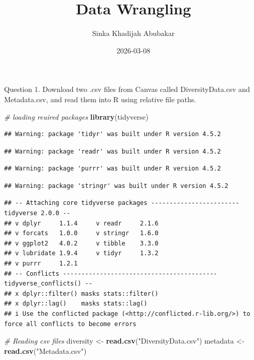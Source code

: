 \documentclass[
]{article}
\title{Data Wrangling}
\author{Sinka Khadijah Abubakar}
\date{2026-03-08}
\newenvironment{Shaded}{\begin{snugshade}}{\end{snugshade}}
\newcommand{\CommentTok}[1]{\textcolor[rgb]{0.56,0.35,0.01}{\textit{#1}}}
\newcommand{\FunctionTok}[1]{\textcolor[rgb]{0.13,0.29,0.53}{\textbf{#1}}}
\newcommand{\NormalTok}[1]{#1}
\newcommand{\OtherTok}[1]{\textcolor[rgb]{0.56,0.35,0.01}{#1}}
\newcommand{\StringTok}[1]{\textcolor[rgb]{0.31,0.60,0.02}{#1}}
\begin{document}
\maketitle

Question 1. Download two .csv files from Canvas called DiversityData.csv
and Metadata.csv, and read them into R using relative file paths.

\begin{Shaded}
\begin{Highlighting}[]
\CommentTok{\# loading reuired packages}
\FunctionTok{library}\NormalTok{(tidyverse)}
\end{Highlighting}
\end{Shaded}

\begin{verbatim}
## Warning: package 'tidyr' was built under R version 4.5.2
\end{verbatim}

\begin{verbatim}
## Warning: package 'readr' was built under R version 4.5.2
\end{verbatim}

\begin{verbatim}
## Warning: package 'purrr' was built under R version 4.5.2
\end{verbatim}

\begin{verbatim}
## Warning: package 'stringr' was built under R version 4.5.2
\end{verbatim}

\begin{verbatim}
## -- Attaching core tidyverse packages ------------------------ tidyverse 2.0.0 --
## v dplyr     1.1.4     v readr     2.1.6
## v forcats   1.0.0     v stringr   1.6.0
## v ggplot2   4.0.2     v tibble    3.3.0
## v lubridate 1.9.4     v tidyr     1.3.2
## v purrr     1.2.1     
## -- Conflicts ------------------------------------------ tidyverse_conflicts() --
## x dplyr::filter() masks stats::filter()
## x dplyr::lag()    masks stats::lag()
## i Use the conflicted package (<http://conflicted.r-lib.org/>) to force all conflicts to become errors
\end{verbatim}

\begin{Shaded}
\begin{Highlighting}[]
\CommentTok{\# Reading csv files}
\NormalTok{diversity }\OtherTok{\textless{}{-}} \FunctionTok{read.csv}\NormalTok{(}\StringTok{"DiversityData.csv"}\NormalTok{)}
\NormalTok{metadata }\OtherTok{\textless{}{-}} \FunctionTok{read.csv}\NormalTok{(}\StringTok{"Metadata.csv"}\NormalTok{)}
\end{Highlighting}
\end{Shaded}
\end{document}
